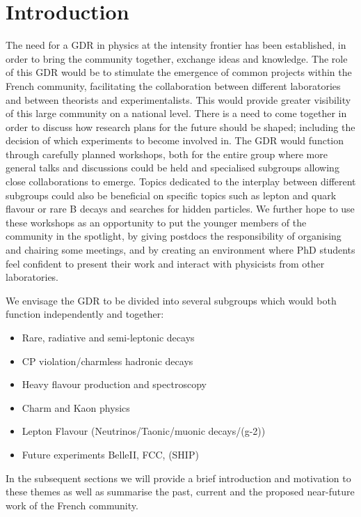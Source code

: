 
\section{Introduction}

The need for a GDR in physics at the intensity frontier has been established, in order to bring the community together, exchange ideas and knowledge.
\!
The role of this GDR would be to stimulate the emergence of common projects within the French community, facilitating the collaboration between different laboratories and between theorists and experimentalists. 
\!
This would provide greater visibility of this large community on a national level.
\!
There is a need to come together in order to discuss how research plans for the future should be shaped; including the decision of which experiments to become involved in.
\!
The GDR would function through carefully planned workshops, both for the entire group where more general talks and discussions could be held and specialised subgroups allowing close collaborations to emerge.
\!
Topics dedicated to the interplay between different subgroups could also be beneficial on specific topics such as lepton and quark flavour or rare B decays and searches for hidden particles.
\!
We further hope to use these workshops as an opportunity to put the younger members of the community in the spotlight, by giving postdocs the responsibility of organising and chairing some meetings, and by creating an environment where PhD students feel confident to present their work and interact with physicists from other laboratories.

We envisage the GDR to be divided into several subgroups which would both function independently and together:
\begin{itemize}
\item Rare, radiative and semi-leptonic decays
\item CP violation/charmless hadronic decays
\item Heavy flavour production and spectroscopy
\item Charm and Kaon physics
\item Lepton Flavour (Neutrinos/Taonic/muonic decays/(g-2))
\item Future experiments BelleII, FCC, (SHIP)
\end{itemize}
In the subsequent sections we will provide a brief introduction and motivation to these themes as well as summarise the past, current and the proposed near-future work of the French community.


